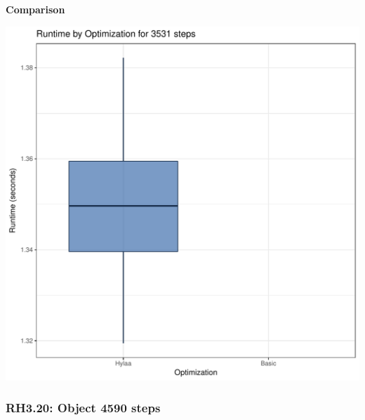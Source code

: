 \documentclass{article}\usepackage[]{graphicx}\usepackage[]{color}
\makeatletter
\def\maxwidth{ %
  \ifdim\Gin@nat@width>\linewidth
    \linewidth
  \else
    \Gin@nat@width
  \fi
}
\newenvironment{knitrout}{}{} %
\makeatother
\begin{document}
 \textbf{Comparison}
  
\begin{knitrout}
\color{fgcolor}
\includegraphics[width=\maxwidth]{figure/RH3_steps3531-1} 

\end{knitrout}


\subsubsection{RH3.20: Object 4590 steps}
\end{document}
